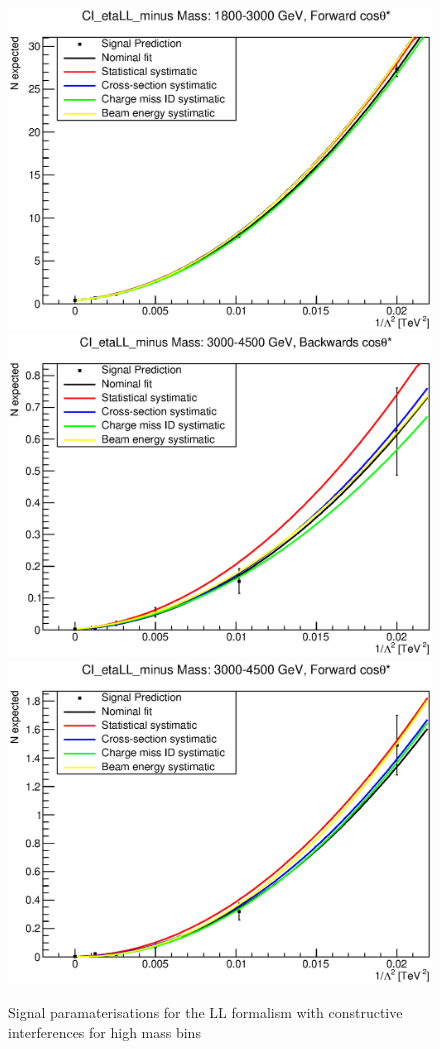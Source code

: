 \begin{figure}[ht]
			\includegraphics[width=0.49\linewidth]{images/thesis_fits/CI_2D_etaLL_minus_Mass_1800-3000_GeV_CTS_0_1.eps}
			\includegraphics[width=0.49\linewidth]{images/thesis_fits/CI_2D_etaLL_minus_Mass_3000-4500_GeV_CTS_-1_0.eps}
			\includegraphics[width=0.49\linewidth]{images/thesis_fits/CI_2D_etaLL_minus_Mass_3000-4500_GeV_CTS_0_1.eps}
		\caption{Signal paramaterisations for the LL formalism with constructive interferences for high mass bins}
		\label{fig:parm_LL_m_2}
	\end{figure}



